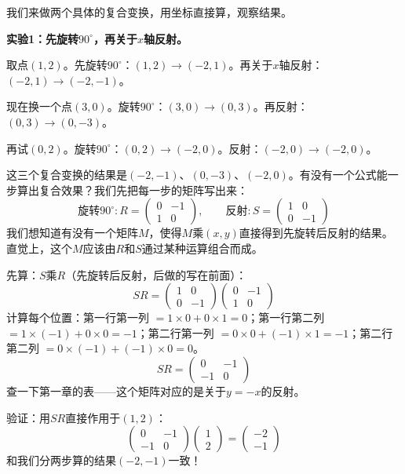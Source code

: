 
我们来做两个具体的复合变换，用坐标直接算，观察结果。

\textbf{实验1：先旋转$90^\circ$，再关于$x$轴反射。}

取点$(1,2)$。先旋转$90^\circ$：$(1,2)\to(-2,1)$。再关于$x$轴反射：$(-2,1)\to(-2,-1)$。

现在换一个点$(3,0)$。旋转$90^\circ$：$(3,0)\to(0,3)$。再反射：$(0,3)\to(0,-3)$。

再试$(0,2)$。旋转$90^\circ$：$(0,2)\to(-2,0)$。反射：$(-2,0)\to(-2,0)$。

这三个复合变换的结果是$(-2,-1)$、$(0,-3)$、$(-2,0)$。有没有一个公式能一步算出复合效果？我们先把每一步的矩阵写出来：
\[
\text{旋转}90^\circ: R=\begin{pmatrix}0&-1\\1&0\end{pmatrix},\qquad
\text{反射}: S=\begin{pmatrix}1&0\\0&-1\end{pmatrix}
\]
我们想知道有没有一个矩阵$M$，使得$M$乘$(x,y)$直接得到先旋转后反射的结果。直觉上，这个$M$应该由$R$和$S$通过某种运算组合而成。

先算：$S$乘$R$（先旋转后反射，后做的写在前面）：
\[
SR = \begin{pmatrix}1&0\\0&-1\end{pmatrix}
\begin{pmatrix}0&-1\\1&0\end{pmatrix}
\]
计算每个位置：第一行第一列 $=1\times0+0\times1=0$；第一行第二列 $=1\times(-1)+0\times0=-1$；第二行第一列 $=0\times0+(-1)\times1=-1$；第二行第二列 $=0\times(-1)+(-1)\times0=0$。
\[
SR = \begin{pmatrix}0&-1\\-1&0\end{pmatrix}
\]
查一下第一章的表——这个矩阵对应的是关于$y=-x$的反射。

验证：用$SR$直接作用于$(1,2)$：
\[
\begin{pmatrix}0&-1\\-1&0\end{pmatrix}\begin{pmatrix}1\\2\end{pmatrix}
= \begin{pmatrix}-2\\-1\end{pmatrix}
\]
和我们分两步算的结果$(-2,-1)$一致！


